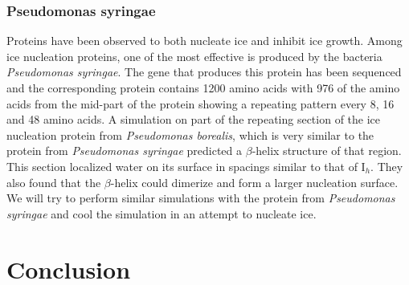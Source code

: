 \documentclass[titlepage]{article}
\begin{document}
\subsubsection{Pseudomonas syringae}
Proteins have been observed to both nucleate ice and inhibit ice growth.  Among ice nucleation proteins, one of the most effective is produced by the bacteria {\it Pseudomonas syringae}.  The gene that produces this protein has been sequenced\cite{GW85} and the corresponding protein contains 1200 amino acids with 976 of the amino acids from the mid-part of the protein showing a repeating pattern every 8, 16 and 48 amino acids.  A simulation on part of the repeating section of the ice nucleation protein from {\it Pseudomonas borealis}, which is very similar to the protein from {\it Pseudomonas syringae} predicted a $\beta$-helix structure of that region\cite{GCWD11}.   This section localized water on its surface in spacings similar to that of I$_{h}$.  They also found that the $\beta$-helix could dimerize and form a larger nucleation surface.  We will try to perform similar simulations with the protein from {\it Pseudomonas syringae} and cool the simulation in an attempt to nucleate ice.

\section{Conclusion}

\singlespacing


\end{document}
